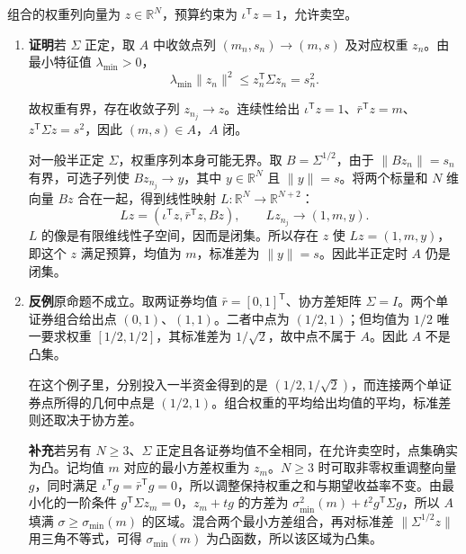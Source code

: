 \begin{solution}
组合的权重列向量为 $z\in\mathbb R^N$，预算约束为 $\iota^{\mathsf T}z=1$，允许卖空。
\begin{enumerate}[label=(\alph*)]
\item \textbf{证明}\quad 若 $\Sigma$ 正定，取 $A$ 中收敛点列 $(m_n,s_n)\to(m,s)$ 及对应权重 $z_n$。由最小特征值 $\lambda_{\min}>0$，
\[
 \lambda_{\min}\|z_n\|^2\le z_n^{\mathsf T}\Sigma z_n=s_n^2.
\]

故权重有界，存在收敛子列 $z_{n_j}\to z$。连续性给出 $\iota^{\mathsf T}z=1$、$\bar r^{\mathsf T}z=m$、$z^{\mathsf T}\Sigma z=s^2$，因此 $(m,s)\in A$，$A$ 闭。

对一般半正定 $\Sigma$，权重序列本身可能无界。取 $B=\Sigma^{1/2}$，由于 $\|Bz_n\|=s_n$ 有界，可选子列使 $Bz_{n_j}\to y$，其中 $y\in\mathbb R^N$ 且 $\|y\|=s$。将两个标量和 $N$ 维向量 $Bz$ 合在一起，得到线性映射 $L:\mathbb R^N\to\mathbb R^{N+2}$：
\[
 Lz=(\iota^{\mathsf T}z,\bar r^{\mathsf T}z,Bz),\qquad Lz_{n_j}\to(1,m,y).
\]
$L$ 的像是有限维线性子空间，因而是闭集。所以存在 $z$ 使 $Lz=(1,m,y)$，即这个 $z$ 满足预算，均值为 $m$，标准差为 $\|y\|=s$。因此半正定时 $A$ 仍是闭集。

\item \textbf{反例}\quad 原命题不成立。取两证券均值 $\bar r=[0,1]^{\mathsf T}$、协方差矩阵 $\Sigma=I$。两个单证券组合给出点 $(0,1)$、$(1,1)$。二者中点为 $(1/2,1)$；但均值为 $1/2$ 唯一要求权重 $[1/2,1/2]$，其标准差为 $1/\sqrt2$，故中点不属于 $A$。因此 $A$ 不是凸集。

在这个例子里，分别投入一半资金得到的是 $(1/2,1/\sqrt2)$，而连接两个单证券点所得的几何中点是 $(1/2,1)$。组合权重的平均给出均值的平均，标准差则还取决于协方差。

\textbf{补充}\quad 若另有 $N\ge3$、$\Sigma$ 正定且各证券均值不全相同，在允许卖空时，点集确实为凸。记均值 $m$ 对应的最小方差权重为 $z_m$。$N\ge3$ 时可取非零权重调整向量 $g$，同时满足 $\iota^{\mathsf T}g=\bar r^{\mathsf T}g=0$，所以调整保持权重之和与期望收益率不变。由最小化的一阶条件 $g^{\mathsf T}\Sigma z_m=0$，$z_m+tg$ 的方差为 $\sigma_{\min}^2(m)+t^2g^{\mathsf T}\Sigma g$，所以 $A$ 填满 $\sigma\ge\sigma_{\min}(m)$ 的区域。混合两个最小方差组合，再对标准差 $\|\Sigma^{1/2}z\|$ 用三角不等式，可得 $\sigma_{\min}(m)$ 为凸函数，所以该区域为凸集。\qedhere
\end{enumerate}
\end{solution}

